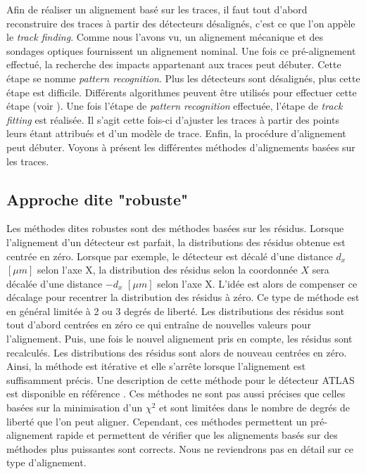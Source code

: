    Afin de r\'ealiser un alignement bas\'e sur les traces, il faut tout d'abord reconstruire des traces \`a partir des d\'etecteurs d\'esalign\'es, c'est ce que l'on app\`ele le \textit{track finding}. Comme nous l'avons vu, un alignement m\'ecanique et des sondages optiques fournissent un alignement nominal. Une fois ce pr\'e-alignement effectu\'e, la recherche des impacts appartenant aux traces peut d\'ebuter. Cette \'etape se nomme \textit{pattern recognition}. Plus les d\'etecteurs sont d\'esalign\'es, plus cette \'etape est difficile. Diff\'erents algorithmes peuvent \^etre utilis\'es pour effectuer cette \'etape (voir \cite{de2012alignment}). Une fois l'\'etape de \textit{pattern recognition} effectu\'ee, l'\'etape de \textit{track fitting} est r\'ealis\'ee. Il s'agit cette fois-ci d'ajuster les traces \`a partir des points leurs \'etant attribu\'es et d'un mod\`ele de trace. Enfin, la proc\'edure d'alignement peut d\'ebuter. Voyons \`a pr\'esent les diff\'erentes m\'ethodes d'alignements bas\'ees sur les traces.

   \subsection{Approche dite "robuste"}

   Les m\'ethodes dites robustes sont des m\'ethodes bas\'ees sur les r\'esidus. Lorsque l'alignement d'un d\'etecteur est parfait, la distributions des r\'esidus obtenue est centr\'ee en z\'ero. Lorsque par exemple, le d\'etecteur est d\'ecal\'e d'une distance $d_x$ $[\mu m]$ selon l'axe X, la distribution des r\'esidus selon la coordonn\'ee $X$ sera d\'ecal\'ee d'une distance $-d_x$ $[\mu m]$ selon l'axe X. L'id\'ee est alors de compenser ce d\'ecalage pour recentrer la distribution des r\'esidus \`a z\'ero. Ce type de m\'ethode est en g\'en\'eral limit\'ee \`a 2 ou 3 degr\'es de libert\'e. Les distributions des r\'esidus sont tout d'abord centr\'ees en z\'ero ce qui entraîne de nouvelles valeurs pour l'alignement. Puis, une fois le nouvel alignement pris en compte, les r\'esidus sont recalcul\'es. Les distributions des r\'esidus sont alors de nouveau centr\'ees en z\'ero. Ainsi, la m\'ethode est it\'erative et elle s'arrête lorsque l'alignement est suffisamment pr\'ecis. Une description de cette m\'ethode pour le d\'etecteur ATLAS est disponible en r\'ef\'erence \cite{Heinemann:2007qm}. Ces m\'ethodes ne sont pas aussi pr\'ecises que celles bas\'ees sur la minimisation d'un $\chi^2$ et sont limit\'ees dans le nombre de degr\'es de libert\'e que l'on peut aligner. Cependant, ces m\'ethodes permettent un pr\'e-alignement rapide et permettent de v\'erifier que les alignements bas\'es sur des m\'ethodes plus puissantes sont corrects. Nous ne reviendrons pas en d\'etail sur ce type d'alignement.
   
